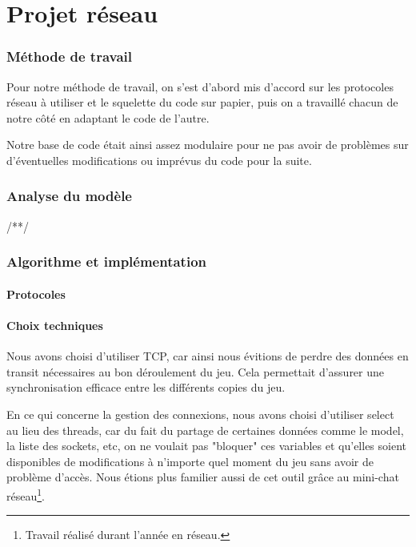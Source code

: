 \documentclass[a4paper]{article}
\begin{document}
\newpage
\part{Projet réseau}

	\section{Méthode de travail}

	Pour notre méthode de travail, on s'est d'abord mis d'accord sur les protocoles réseau à utiliser et le squelette du code sur papier, puis on a travaillé chacun de notre côté en adaptant le code de l'autre.

	Notre base de code était ainsi assez modulaire pour ne pas avoir de problèmes sur d'éventuelles modifications ou imprévus du code pour la suite.

	\section{Analyse du modèle}

	/**/

	\section{Algorithme et implémentation}
		\subsection{Protocoles}
		
		

		\subsection{Choix techniques}
		Nous avons choisi d'utiliser TCP, car ainsi nous évitions de perdre des données en transit nécessaires au bon déroulement du jeu. Cela permettait d'assurer une synchronisation efficace entre les différents copies du jeu.
		
		En ce qui concerne la gestion des connexions, nous avons choisi d'utiliser select au lieu des threads, car du fait du partage de certaines données comme le model, la liste des sockets, etc, on ne voulait pas "bloquer" ces variables et qu'elles soient disponibles de modifications à n'importe quel moment du jeu sans avoir de problème d'accès. Nous étions plus familier aussi de cet outil grâce au mini-chat réseau\footnote{Travail réalisé durant l'année en réseau.}.
		
\end{document}
